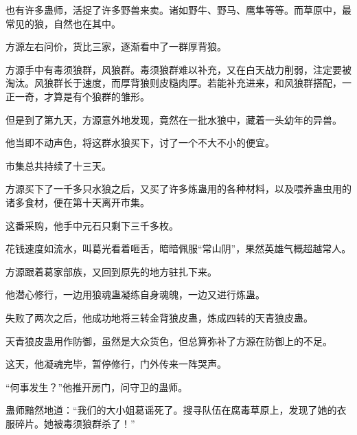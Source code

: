 \begin{this_body}
也有许多蛊师，活捉了许多野兽来卖。诸如野牛、野马、鹰隼等等。而草原中，最常见的狼，自然也在其中。

方源左右问价，货比三家，逐渐看中了一群厚背狼。

方源手中有毒须狼群，风狼群。毒须狼群难以补充，又在白天战力削弱，注定要被淘汰。风狼群长于速度，而厚背狼则皮糙肉厚。若能补充进来，和风狼群搭配，一正一奇，才算是有个狼群的雏形。

但是到了第九天，方源意外地发现，竟然在一批水狼中，藏着一头幼年的异兽。

他当即不动声色，将这群水狼买下，讨了一个不大不小的便宜。

市集总共持续了十三天。

方源买下了一千多只水狼之后，又买了许多炼蛊用的各种材料，以及喂养蛊虫用的诸多食材，便在第十天离开市集。

这番采购，他手中元石只剩下三千多枚。

花钱速度如流水，叫葛光看着咂舌，暗暗佩服“常山阴”，果然英雄气概超越常人。

方源跟着葛家部族，又回到原先的地方驻扎下来。

他潜心修行，一边用狼魂蛊凝练自身魂魄，一边又进行炼蛊。

失败了两次之后，他成功地将三转金背狼皮蛊，炼成四转的天青狼皮蛊。

天青狼皮蛊用作防御，虽然是大众货色，但总算弥补了方源在防御上的不足。

这天，他凝魂完毕，暂停修行，门外传来一阵哭声。

“何事发生？”他推开房门，问守卫的蛊师。

蛊师黯然地道：“我们的大小姐葛谣死了。搜寻队伍在腐毒草原上，发现了她的衣服碎片。她被毒须狼群杀了！”

\end{this_body}

